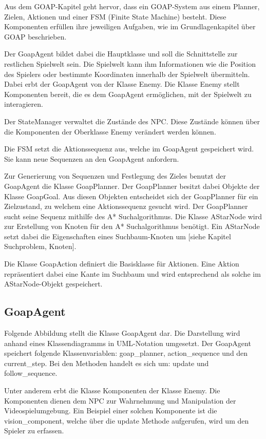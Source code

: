 Aus dem GOAP-Kapitel geht hervor, dass ein GOAP-System aus einem Planner, Zielen, Aktionen und einer FSM (Finite State Machine) besteht. Diese Komponenten erfüllen ihre jeweiligen Aufgaben, wie im Grundlagenkapitel über GOAP beschrieben.

Der GoapAgent bildet dabei die Hauptklasse und soll die Schnittstelle zur restlichen Spielwelt sein. Die Spielwelt kann ihm Informationen wie die Position des Spielers oder bestimmte Koordinaten innerhalb der Spielwelt übermitteln. Dabei erbt der GoapAgent von der Klasse Enemy. Die Klasse Enemy stellt Komponenten bereit, die es dem GoapAgent ermöglichen, mit der Spielwelt zu interagieren.

Der StateManager verwaltet die Zustände des NPC. Diese Zustände können über die Komponenten der Oberklasse Enemy verändert werden können.

Die FSM setzt die Aktionssequenz aus, welche im GoapAgent gespeichert wird. Sie kann neue Sequenzen an den GoapAgent anfordern.

Zur Generierung von Sequenzen und Festlegung des Zieles benutzt der GoapAgent die Klasse GoapPlanner. Der GoapPlanner besitzt dabei Objekte der Klasse GoapGoal. Aus diesen Objekten entscheidet sich der GoapPlanner für ein Zielzustand, zu welchem eine Aktionssequenz gesucht wird.
Der GoapPlanner sucht seine Sequenz mithilfe des A* Suchalgorithmus. Die Klasse AStarNode wird zur Erstellung von Knoten für den A* Suchalgorithmus benötigt. Ein AStarNode setzt dabei die Eigenschaften eines Suchbaum-Knoten um [siehe Kapitel Suchproblem, Knoten].

Die Klasse GoapAction definiert die Basisklasse für Aktionen. Eine Aktion repräsentiert dabei eine Kante im Suchbaum und wird entsprechend als solche im AStarNode-Objekt gespeichert.



\subsection{GoapAgent}

Folgende Abbildung stellt die Klasse GoapAgent dar. Die Darstellung wird anhand eines Klassendiagramms in UML-Notation umgesetzt. Der GoapAgent speichert folgende Klassenvariablen: goap\_planner, action\_sequence und den current\_step. Bei den Methoden handelt es sich um: update und follow\_sequence. 

Unter anderem erbt die Klasse Komponenten der Klasse Enemy. Die Komponenten dienen dem NPC zur Wahrnehmung und Manipulation der Videospielumgebung. Ein Beispiel einer solchen Komponente ist die vision\_component, welche über die update Methode aufgerufen, wird um den Spieler zu erfassen.

